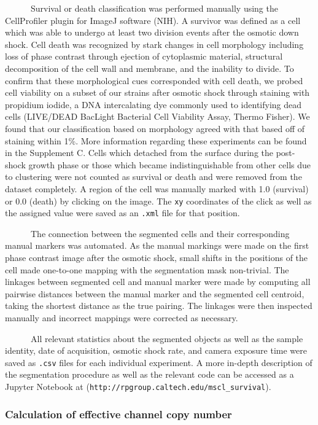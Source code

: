 ~ ~ ~
~Survival
or
death
classification
was
performed
manually
using
the
CellProfiler
plugin
for
ImageJ
software
(NIH).
A
survivor
was
defined
as a
cell
which
was
able
to
undergo
at
least
two
division
events
after
the
osmotic
down
shock.
Cell
death
was
recognized
by
stark
changes
in
cell
morphology
including
loss
of
phase
contrast
through
ejection
of
cytoplasmic
material,
structural
decomposition
of the
cell
wall
and
membrane,
and
the
inability
to
divide.
To
confirm
that
these
morphological
cues
corresponded
with
cell
death,
we
probed
cell
viability
on a
subset
of our
strains
after
osmotic
shock
through
staining
with
propidium
iodide,
a DNA
intercalating
dye
commonly
used
to
identifying
dead
cells
(LIVE/DEAD
BacLight
Bacterial
Cell
Viability
Assay,
Thermo
Fisher).
We
found
that
our
classification
based
on
morphology
agreed
with
that
based
off of
staining
within
1\%.
More
information
regarding
these
experiments
can be
found
in the
Supplement
C.
Cells
which
detached
from
the
surface
during
the
post-shock
growth
phase
or
those
which
became
indistinguishable
from
other
cells
due to
clustering
were
not
counted
as
survival
or
death
and
were
removed
from
the
dataset
completely.
A
region
of the
cell
was
manually
marked
with
1.0
(survival)
or 0.0
(death)
by
clicking
on the
image.
The
\texttt{xy}
coordinates
of the
click
as
well
as the
assigned
value
were
saved
as an
\texttt{.xml}
file
for
that
position.

~ ~ ~
~The
connection
between
the
segmented
cells
and
their
corresponding
manual
markers
was
automated.
As the
manual
markings
were
made
on the
first
phase
contrast
image
after
the
osmotic
shock,
small
shifts
in the
positions
of the
cell
made
one-to-one
mapping
with
the
segmentation
mask
non-trivial.
The
linkages
between
segmented
cell
and
manual
marker
were
made
by
computing
all
pairwise
distances
between
the
manual
marker
and
the
segmented
cell
centroid,
taking
the
shortest
distance
as the
true
pairing.
The
linkages
were
then
inspected
manually
and
incorrect
mappings
were
corrected
as
necessary.

~ ~ ~
~All
relevant
statistics
about
the
segmented
objects
as
well
as the
sample
identity,
date
of
acquisition,
osmotic
shock
rate,
and
camera
exposure
time
were
saved
as
\texttt{.csv}
files
for
each
individual
experiment.
A more
in-depth
description
of the
segmentation
procedure
as
well
as the
relevant
code
can be
accessed
as a
Jupyter
Notebook
at
(\texttt{http://rpgroup.caltech.edu/mscl\_survival}).

\subsubsection{Calculation
of
effective
channel
copy
number}\label{calculation-of-effective-channel-copy-number}

